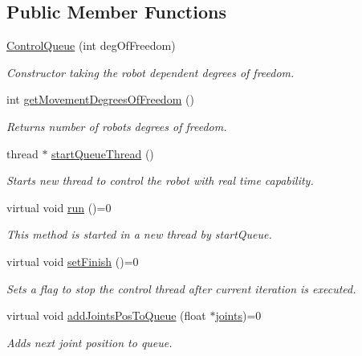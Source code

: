 \subsection*{\-Public \-Member \-Functions}
\begin{DoxyCompactItemize}
\item 
\hyperlink{classControlQueue_a3a6be1aca489a92e8ff7102e0544de86}{\-Control\-Queue} (int deg\-Of\-Freedom)
\begin{DoxyCompactList}\small\item\em \-Constructor taking the robot dependent degrees of freedom. \end{DoxyCompactList}\item 
int \hyperlink{classControlQueue_aff978436e653dbb2e3de1ca8c7c4a4af}{get\-Movement\-Degrees\-Of\-Freedom} ()
\begin{DoxyCompactList}\small\item\em \-Returns number of robots degrees of freedom. \end{DoxyCompactList}\item 
thread $\ast$ \hyperlink{classControlQueue_ad625c246b5994cb8fab6e59610bc2f40}{start\-Queue\-Thread} ()
\begin{DoxyCompactList}\small\item\em \-Starts new thread to control the robot with real time capability. \end{DoxyCompactList}\item 
virtual void \hyperlink{classControlQueue_a532fc65ff27e37e35078ae2ccc54e408}{run} ()=0
\begin{DoxyCompactList}\small\item\em \-This method is started in a new thread by start\-Queue. \end{DoxyCompactList}\item 
virtual void \hyperlink{classControlQueue_a07626e6ef2bdf7e5fe59a2548ab0a213}{set\-Finish} ()=0
\begin{DoxyCompactList}\small\item\em \-Sets a flag to stop the control thread after current iteration is executed. \end{DoxyCompactList}\item 
virtual void \hyperlink{classControlQueue_a8750612f82e110cb5378672d6f64ca6f}{add\-Joints\-Pos\-To\-Queue} (float $\ast$\hyperlink{fri__example_8m_a094bd681592faefb6f9be3d22d34cbcd}{joints})=0
\begin{DoxyCompactList}\small\item\em \-Adds next joint position to queue. \end{DoxyCompactList}\item 

\end{DoxyCompactItemize}
